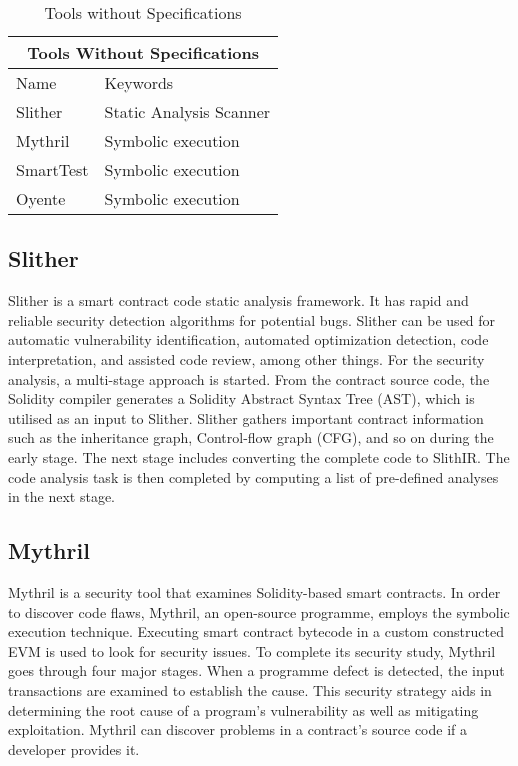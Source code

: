 \documentclass[a4paper,sigconf, language=french,
language=german, language=spanish, language=english]{acmart}
\begin{document}
\begin{table*}
  \caption{Tools without Specifications}
  \label{tab:ToolsWithoutSpec}
  \begin{tabular}{ |p{5cm}|p{5cm}|  }
  \hline
  \multicolumn{2}{|c|}{Tools Without Specifications } \\
  \hline
  Name & Keywords\\
  \hline
  Slither & Static Analysis Scanner\\
  \hline
  Mythril & Symbolic execution \\
  \hline
  SmartTest & Symbolic execution\\
  \hline
  Oyente  & Symbolic execution \\
  \hline
 \end{tabular}
\end{table*}
 

\subsection{Slither} Slither is a smart contract code static analysis framework.
It has rapid and reliable security detection algorithms for potential bugs.
Slither can be used for automatic vulnerability identification, automated optimization detection, code interpretation, and assisted code review, among other things.
For the security analysis, a multi-stage approach is started.
From the contract source code, the Solidity compiler generates a Solidity Abstract Syntax Tree (AST), which is utilised as an input to Slither.
Slither gathers important contract information such as the inheritance graph, Control-flow graph (CFG), and so on during the early stage.
The next stage includes converting the complete code to SlithIR.
The code analysis task is then completed by computing a list of pre-defined analyses in the next stage. 

\subsection{Mythril} Mythril is a security tool that examines Solidity-based smart contracts.
In order to discover code flaws, Mythril, an open-source programme, employs the symbolic execution technique.
Executing smart contract bytecode in a custom constructed EVM is used to look for security issues.
To complete its security study, Mythril goes through four major stages.
When a programme defect is detected, the input transactions are examined to establish the cause.
This security strategy aids in determining the root cause of a program's vulnerability as well as mitigating exploitation.
Mythril can discover problems in a contract's source code if a developer provides it. 
\end{document}
